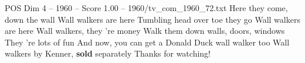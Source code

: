 \begin{textsample}{POS Dim 4 – 1960 – Score 1.00 – 1960/tv\_com\_1960\_72.txt}  \label{ex:f4_pos_020}
Here they come, down the wall Wall walkers are here Tumbling head over toe they go Wall walkers are here Wall walkers, they 're money Walk them down walls, doors, windows They 're lots of fun And now, you can get a Donald Duck wall walker too Wall walkers by Kenner, \textbf{sold} separately Thanks for watching!

\end{textsample}

